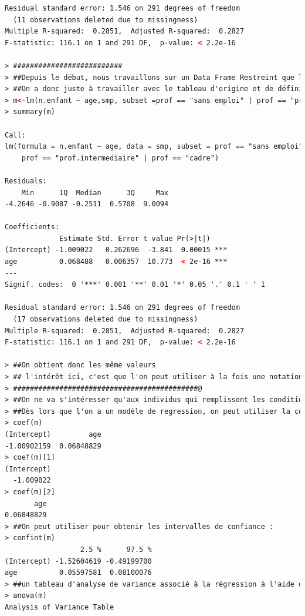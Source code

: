 \begin{lstlisting}[language=html]
Residual standard error: 1.546 on 291 degrees of freedom
  (11 observations deleted due to missingness)
Multiple R-squared:  0.2851,  Adjusted R-squared:  0.2827 
F-statistic: 116.1 on 1 and 291 DF,  p-value: < 2.2e-16

> ##########################
> ##Depuis le début, nous travaillons sur un Data Frame Restreint que l'on a obtenu avec la fonction subset. La fonction lm() permet de réduire directement le Data Frame :
> ##On a donc juste à travailler avec le tableau d'origine et de définir les options de filtre que l'on souhaite appliquer :
> m<-lm(n.enfant ~ age,smp, subset =prof == "sans emploi" | prof == "prof.intermediaire" | prof == "cadre")
> summary(m)

Call:
lm(formula = n.enfant ~ age, data = smp, subset = prof == "sans emploi" | 
    prof == "prof.intermediaire" | prof == "cadre")

Residuals:
    Min      1Q  Median      3Q     Max 
-4.2646 -0.9087 -0.2511  0.5708  9.0094 

Coefficients:
             Estimate Std. Error t value Pr(>|t|)    
(Intercept) -1.009022   0.262696  -3.841  0.00015 ***
age          0.068488   0.006357  10.773  < 2e-16 ***
---
Signif. codes:  0 '***' 0.001 '**' 0.01 '*' 0.05 '.' 0.1 ' ' 1

Residual standard error: 1.546 on 291 degrees of freedom
  (17 observations deleted due to missingness)
Multiple R-squared:  0.2851,  Adjusted R-squared:  0.2827 
F-statistic: 116.1 on 1 and 291 DF,  p-value: < 2.2e-16

> ##On obtient donc les même valeurs
> ## l'intérêt ici, c'est que l'on peut utiliser à la fois une notation par formule, on décrit la relation entre le nombre d'enfants qui est la variable de réponse et l'âge qui est la variable explicative, ces variables se trouvent dans le data-frame qui s'appelle smp. Par contre ce data-frame-là va être filtré selon les critères qui sont indiqués (dans la commande) dans l'option subset.
> ############################################@
> ##On ne va s'intéresser qu'aux individus qui remplissent les conditions profession égal soit sans emploi, soit profession intermédiaire, soit cadre.
> ##Dès lors que l'on a un modèle de regression, on peut utiliser la commande coef pour afficher ces derniers :
> coef(m)
(Intercept)         age 
-1.00902159  0.06848829 
> coef(m)[1]
(Intercept) 
  -1.009022 
> coef(m)[2]
       age 
0.06848829 
> ##On peut utiliser pour obtenir les intervalles de confiance :
> confint(m)
                  2.5 %      97.5 %
(Intercept) -1.52604619 -0.49199700
age          0.05597581  0.08100076
> ##un tableau d'analyse de variance associé à la régression à l'aide de la commande anova() :
> anova(m)
Analysis of Variance Table


\end{lstlisting}
